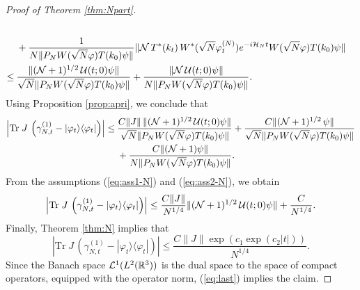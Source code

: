 \documentclass[11pt,a4paper]{article}
\newcommand{\cU}{{\cal U}}
\newcommand{\bR}{{\mathbb R}}
\newcommand{\tr}{\mbox{Tr}}
\newcommand{\cH}{{\cal H}}
\newcommand{\cL}{{\cal L}}
\newcommand{\cN}{{\cal N}}
\begin{document}
\begin{proof}[Proof of Theorem \ref{thm:Npart}]
\[\begin{split}
\\ &+  \frac{1}{N \| P_N W(\sqrt{N} \varphi) T(k_0) \psi \|} \| \cN \, T^* (k_t) \, W^* (\sqrt{N} \varphi_t^{(N)})  e^{-i\cH_N t}  W(\sqrt{N} \varphi) T(k_0) \psi \|  \\ \leq \:& \frac{ \| (\cN+1)^{1/2} \, \cU (t;0) \psi \|}{\sqrt{N} \| P_N W(\sqrt{N} \varphi) T(k_0) \psi \|}  + \frac{ \| \cN \, \cU (t;0) \psi \| 
}{N \|  P_N W(\sqrt{N} \varphi) T(k_0) \psi \|}.  \end{split} \]
Using Proposition \ref{prop:apri}, we conclude that
\[  \begin{split}
\left| \tr \; J \, \left( \gamma^{(1)}_{N,t} - |\varphi_t \rangle\langle \varphi_t| \right)  \right|  \leq \:& \frac{C\| J \| \, \| (\cN+1)^{1/2} \, \cU (t;0) \psi \|}{\sqrt{N} \| P_N W(\sqrt{N} \varphi) T(k_0) \psi \|}   + 
\frac{C \| (\cN+1)^{1/2} \, \psi \|  }{\sqrt{N} \|  P_N W(\sqrt{N} \varphi) T(k_0) \psi \|}  
\\ &+ \frac{C \| (\cN+1) \psi \| }{N \| P_N W(\sqrt{N} \varphi) T(k_0) \psi \|}.  \end{split}
\]
{F}rom the assumptions (\ref{eq:ass1-N}) and (\ref{eq:ass2-N}), we obtain
\[ \left| \tr \; J \, \left( \gamma^{(1)}_{N,t} - |\varphi_t \rangle\langle \varphi_t| \right)  \right| \leq \frac{C\| J \|}{N^{1/4}} \| (\cN+1)^{1/2} \, \cU (t;0) \psi \| + \frac{C}{N^{1/4}}. \]
Finally, Theorem \ref{thm:N} implies that
\begin{equation}\label{eq:last} \left| \tr \; J \, \left( \gamma^{(1)}_{N,t} - |\varphi_t \rangle\langle \varphi_t| \right)  \right| \leq \frac{C\| J \| \exp \left(c_1 \exp (c_2 |t|) \right)}{N^{1/4}}. \end{equation}
Since the Banach space $\cL^1 (L^2 (\bR^3))$ is the dual space to the space of compact operators, equipped with the operator norm, (\ref{eq:last}) implies the claim. 
\end{proof}
\end{document}
